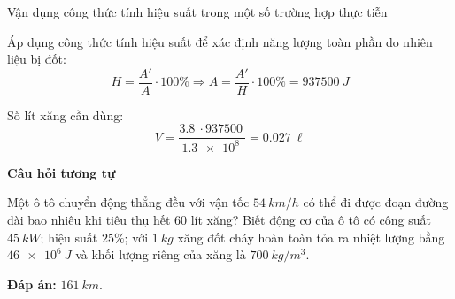 \begin{dang}{Vận dụng công thức tính hiệu suất trong một số trường hợp thực tiễn}
{		Áp dụng công thức tính hiệu suất để xác định năng lượng toàn phần do nhiên liệu bị đốt:
		$$H=\dfrac{A'}{A} \cdot 100\% \Rightarrow A=\dfrac{A'}{H} \cdot 100\% = \SI{937500}{J}$$
		
		Số lít xăng cần dùng:
		$$V=\dfrac{\SI{3.8}{} \cdot \SI{937500}{}}{\SI{1.3e8}{}} = \SI{0.027}{\ell}$$
		
		\begin{center}
			\textbf{Câu hỏi tương tự}
		\end{center}
		
		Một ô tô chuyển động thẳng đều với vận tốc $\SI{54}{km/h}$ có thể đi được đoạn đường dài bao nhiêu khi tiêu thụ hết 60 lít xăng? Biết động cơ của ô tô có công suất $\SI{45}{kW}$; hiệu suất $25\%$; với $\SI{1}{kg}$ xăng đốt cháy hoàn toàn tỏa ra nhiệt lượng bằng $\SI{46e6}{J}$ và khối lượng riêng của xăng là $\SI{700}{kg/m^3}$.
		
		\textbf{Đáp án:} $\SI{161}{km}$.
	}
\end{dang}




